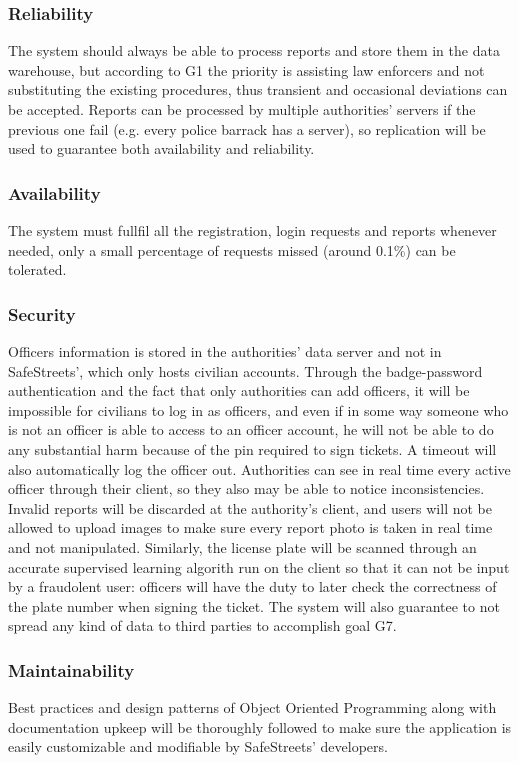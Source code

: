 \documentclass[12pt,a4paper]{article}
\begin{document}
\subsubsection{Reliability}
The system should always be able to process reports and store them in the data warehouse, but according to G1 the priority is assisting law enforcers and not substituting the existing procedures, thus transient and occasional deviations can be accepted.  Reports can be processed by multiple authorities' servers if the previous one fail (e.g. every police barrack has a server), so replication will be used to guarantee both availability and reliability.
\subsubsection{Availability}
The system must fullfil all the registration, login requests and reports whenever needed, only a small percentage of requests missed (around 0.1\%) can be tolerated. 
\subsubsection{Security}
Officers information is stored in the authorities' data server and not in SafeStreets', which only hosts civilian accounts. Through the badge-password authentication and the fact that only authorities can add officers, it will be impossible for civilians to log in as officers, and even if in some way someone who is not an officer is able to access to an officer account, he will not be able to do any substantial harm because of the pin required to sign tickets. A timeout will also automatically log the officer out. Authorities can see in real time every active officer through their client, so they also may be able to notice inconsistencies. Invalid reports will be discarded at the authority's client, and users will not be allowed to upload images to make sure every report photo is taken in real time and not manipulated. Similarly, the license plate will be scanned through an accurate supervised learning algorith run on the client so that it can not be input by a fraudolent user: officers will have the duty to later check the correctness of the plate number when signing the ticket.
The system will also guarantee to not spread any kind of data to third parties to accomplish goal G7.
\subsubsection{Maintainability}
Best practices and design patterns of Object Oriented Programming along with documentation upkeep will be thoroughly followed to make sure the application is easily customizable and modifiable by SafeStreets' developers.
\end{document}

